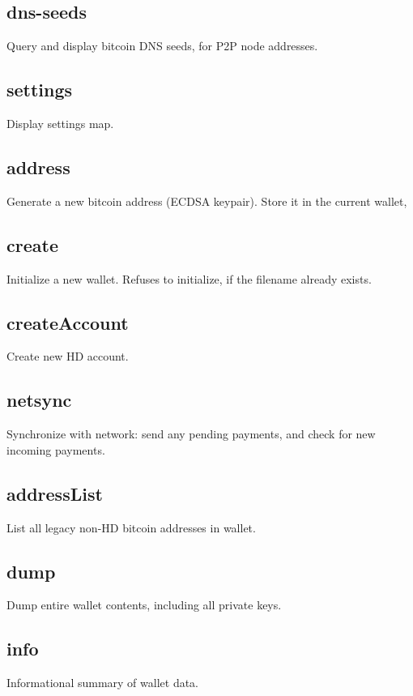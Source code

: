 \subsection*{dns-\/seeds }

Query and display bitcoin D\-N\-S seeds, for P2\-P node addresses.

\subsection*{settings }

Display settings map.

\subsection*{address }

Generate a new bitcoin address (E\-C\-D\-S\-A keypair). Store it in the current wallet,

\subsection*{create }

Initialize a new wallet. Refuses to initialize, if the filename already exists.

\subsection*{create\-Account }

Create new H\-D account.

\subsection*{netsync }

Synchronize with network\-: send any pending payments, and check for new incoming payments.

\subsection*{address\-List }

List all legacy non-\/\-H\-D bitcoin addresses in wallet.

\subsection*{dump }

Dump entire wallet contents, including all private keys.

\subsection*{info }

Informational summary of wallet data. 